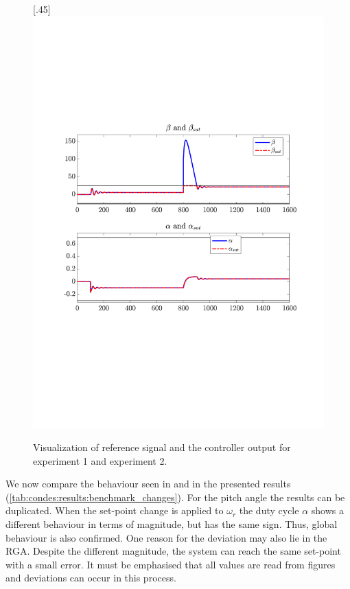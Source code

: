 \begin{figure}[H]
[.45\textwidth]{\includegraphics[width=1\linewidth, scale=1, trim=60 230 55 150,clip]{fig/Open_loop/exp_2_in.pdf}}

    \caption{Visualization of reference signal and the controller output for experiment 1 and experiment 2.}
    \label{fig:condes:results:benchmark_compare}
\end{figure}


We now compare the behaviour seen in \cite{Fragoso_et_al_2017} and in the presented results (\autoref{tab:condes:results:benchmark_changes}).
For the pitch angle the results can be duplicated.
When the set-point change is applied to $\omega_r$ the duty cycle $\alpha$ shows a different behaviour in terms of magnitude, but has the same sign.
Thus, global behaviour is also confirmed.
One reason for the deviation may also lie in the RGA.
Despite the different magnitude, the system can reach the same set-point with a small error.
It must be emphasised that all values are read from figures and deviations can occur in this process.


